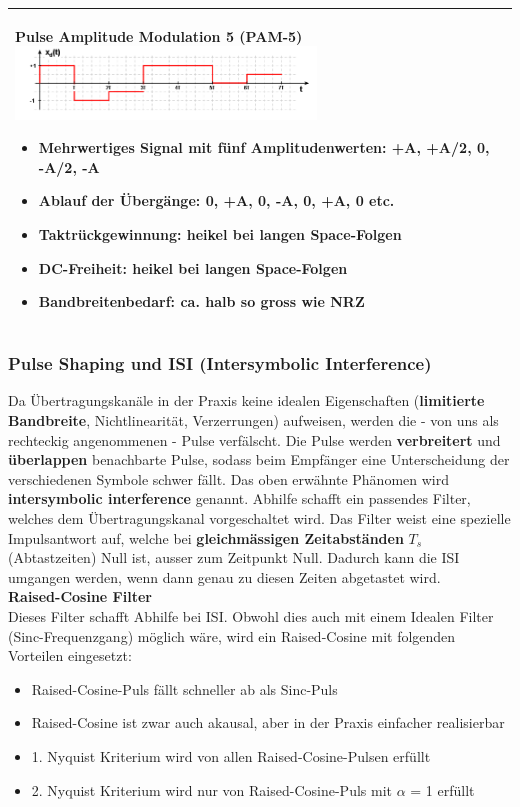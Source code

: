 \begin{longtable}{|p{9cm}|p{9cm}|}
	\textbf{Pulse Amplitude Modulation 5 (PAM-5)}\newline
	\includegraphics[width=8cm]{bilder/DigitaleBasisbandSignale/PulseAmplitudeModulation5.png}\newline
	\begin{itemize}[noitemsep]
		\item Mehrwertiges Signal mit fünf Amplitudenwerten: +A, +A/2, 0, -A/2, -A
		\item \textbf{Ablauf der Übergänge:} 0, +A, 0, -A, 0, +A, 0 etc.
		\item \textbf{Taktrückgewinnung:} heikel bei langen Space-Folgen
		\item \textbf{DC-Freiheit:} heikel bei langen Space-Folgen
		\item \textbf{Bandbreitenbedarf:} ca. halb so gross wie NRZ
	\end{itemize}
	&\\
	\hline
\end{longtable}

\newpage
\subsubsection{Pulse Shaping und ISI (Intersymbolic Interference) }
Da Übertragungskanäle in der Praxis keine idealen Eigenschaften 
(\textbf{limitierte Bandbreite}, Nichtlinearität, Verzerrungen) aufweisen,
werden die - von uns als rechteckig
angenommenen - Pulse verfälscht. Die Pulse werden \textbf{verbreitert} und \textbf{überlappen}
benachbarte Pulse, sodass beim Empfänger eine Unterscheidung der verschiedenen Symbole schwer
fällt. 
Das oben erwähnte Phänomen wird \textbf{intersymbolic interference} genannt.
Abhilfe schafft ein passendes Filter, welches dem Übertragungskanal vorgeschaltet wird. Das Filter
weist eine spezielle Impulsantwort auf, welche bei \textbf{gleichmässigen Zeitabständen} $T_s$
(Abtastzeiten) Null ist, ausser zum Zeitpunkt Null. Dadurch kann die ISI umgangen werden, wenn dann
genau zu diesen Zeiten abgetastet wird. \\ 

\textbf{Raised-Cosine Filter} \\
Dieses Filter schafft Abhilfe bei ISI. Obwohl dies auch mit einem Idealen Filter
(Sinc-Frequenzgang) möglich wäre, wird ein Raised-Cosine mit folgenden Vorteilen eingesetzt:
\begin{itemize}
  \item Raised-Cosine-Puls fällt schneller ab als Sinc-Puls
  \item Raised-Cosine ist zwar auch akausal, aber in der Praxis einfacher realisierbar
  \item 1. Nyquist Kriterium wird von allen Raised-Cosine-Pulsen erfüllt
  \item 2. Nyquist Kriterium wird nur von Raised-Cosine-Puls mit $\alpha$ = 1 erfüllt
\end{itemize}

